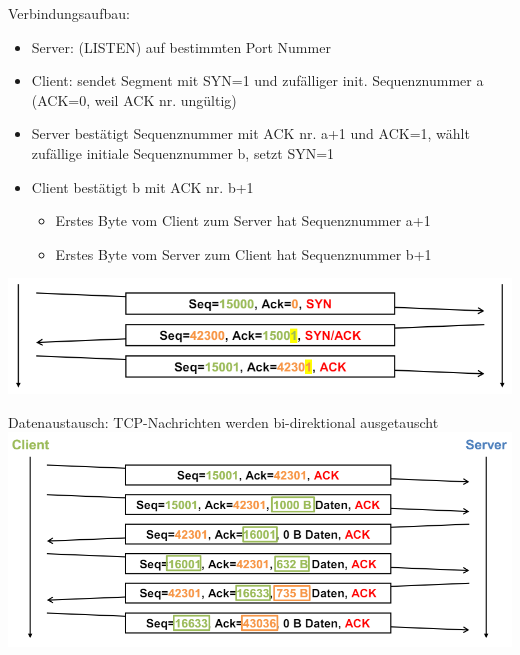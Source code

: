\begin{example}
    Verbindungsaufbau:
    \begin{itemize}
        \item Server: (LISTEN) auf bestimmten Port Nummer
        \item Client: sendet Segment mit SYN=1 und zufälliger init. Sequenznummer a (ACK=0, weil ACK nr. ungültig)
        \item Server bestätigt Sequenznummer mit ACK nr. a+1 und ACK=1, wählt zufällige initiale Sequenznummer b, setzt SYN=1
        \item Client bestätigt b mit ACK nr. b+1 
        \begin{itemize}
            \item Erstes Byte vom Client zum Server hat Sequenznummer a+1
            \item Erstes Byte vom Server zum Client hat Sequenznummer b+1
        \end{itemize}
    \end{itemize}
    \centering
        \includegraphics[width=0.8\linewidth]{images/example_verbindungsaufbau_tcp.png}
\end{example}

\begin{example}
    Datenaustausch: TCP-Nachrichten werden bi-direktional ausgetauscht\\
    \centering
    \includegraphics[width=0.8\linewidth]{images/tcp_datenaustausch_ex.png}
\end{example}

